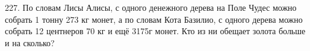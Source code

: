 227. По словам Лисы Алисы, с одного денежного дерева на Поле Чудес можно собрать 1 тонну 273 кг монет, а по словам Кота Базилио, с одного дерева можно собрать 12 центнеров 70 кг и ещё 3175г монет. Кто из ни обещает золота больше и на сколько?\\
